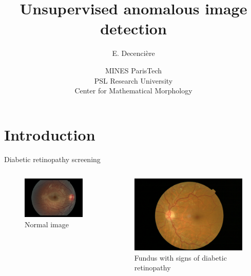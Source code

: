 \documentclass[xcolor=pdftex,dvipsnames,table,mathserif]{beamer}
\title{Unsupervised anomalous image detection}
\author{E. Decencière}
\date{MINES ParisTech\\
  PSL Research University\\
  Center for Mathematical Morphology
}
\begin{document}
\frame{\titlepage}


\section{Introduction}

\begin{frame}{Diabetic retinopathy screening}

  \begin{columns}
    \begin{column}{.5\textwidth}
  \begin{figure}[ht]
    \centering
    \includegraphics[width=\textwidth]{fundus1}
    \caption{Normal image}
  \end{figure}

    \end{column}

    \begin{column}{.5\textwidth}

\begin{figure}[ht]
  \centering
  \includegraphics[width=\textwidth]{ret-dr}
  \caption{Fundus with signs of diabetic retinopathy}
\end{figure}



\end{column}
\end{columns}
\end{frame}
\end{document}
